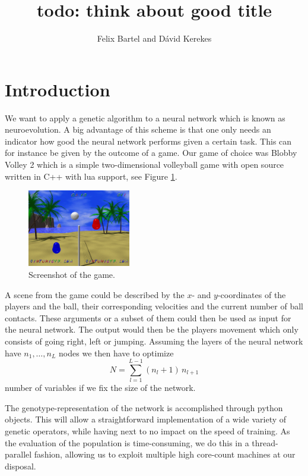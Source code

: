 \documentclass[11pt,a4paper]{scrartcl}
\date{}
\title{todo: think about good title}
\author{Felix Bartel and D\'avid Kerekes}
\begin{document}
\maketitle

\section{Introduction}

We want to apply a genetic algorithm to a neural network which is known as neuroevolution.
A big advantage of this scheme is that one only needs an indicator how good the neural network performs given a certain task.
This can for instance be given by the outcome of a game.
Our game of choice was Blobby Volley 2 which is a simple two-dimensional volleyball game with open source written in C++ with lua support, see Figure \ref{fig:screenshot}.

\begin{figure}[H]
\center
\includegraphics[width=0.4\textwidth]{img/screenshot.png}
\caption{Screenshot of the game.}
\label{fig:screenshot}
\end{figure}

A scene from the game could be described by the $x$- and $y$-coordinates of the players and the ball, their corresponding velocities and the current number of ball contacts.
These arguments or a subset of them could then be used as input for the neural network.
The output would then be the players movement which only consists of going right, left or jumping.
Assuming the layers of the neural network have $n_1,\dots,n_L$ nodes we then have to optimize \[N = \sum_{l=1}^{L-1} (n_l+1) \, n_{l+1}\] number of variables if we fix the size of the network.

The genotype-representation of the network is accomplished through python objects. This will allow a straightforward implementation of a wide variety of genetic operators, while having next to no impact on the speed of training.
As the evaluation of the population is time-consuming, we do this in a thread-parallel fashion, allowing us to exploit multiple high core-count machines at our disposal.
\end{document}
